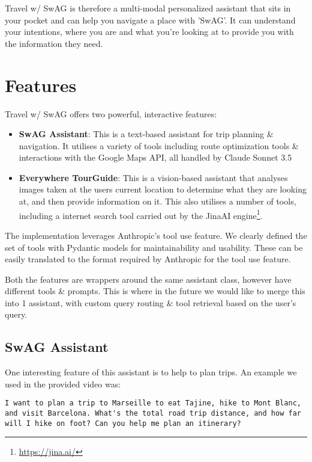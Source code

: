 \documentclass{article}
\begin{document}
Travel w/ SwAG is therefore a multi-modal personalized assistant that sits in your pocket and can help you navigate a place with 'SwAG'. It can understand your intentions, where you are and what you're looking at to provide you with the information they need.

\section{Features}

Travel w/ SwAG  offers two powerful, interactive features:

\begin{itemize}
\item \textbf{SwAG Assistant}: This is a text-based assistant for trip planning \& navigation. It utilises a variety of tools including route optimization tools \& interactions with the Google Maps API, all handled by Claude Sonnet 3.5
\item \textbf{Everywhere TourGuide}: This is a vision-based assistant that analyses images taken at the users current location to determine what they are looking at, and then provide information on it. This also utilises a number of tools, including a internet search tool carried out by the JinaAI engine\footnote{\url{https://jina.ai/}}.
\end{itemize}

The implementation leverages Anthropic's tool use feature. We clearly defined the set of tools with Pydantic models for maintainability and usability. These can be easily translated to the format required by Anthropic for the tool use feature.

Both the features are wrappers around the same assistant class, however have different tools \& prompts. This is where in the future we would like to merge this into 1 assistant, with custom query routing \& tool retrieval based on the user's query.

\subsection{SwAG Assistant}

One interesting feature of this assistant is to help to plan trips. An example we used in the provided video was:

\begin{lstlisting}
I want to plan a trip to Marseille to eat Tajine, hike to Mont Blanc, and visit Barcelona. What's the total road trip distance, and how far will I hike on foot? Can you help me plan an itinerary?
\end{lstlisting}
\end{document}
